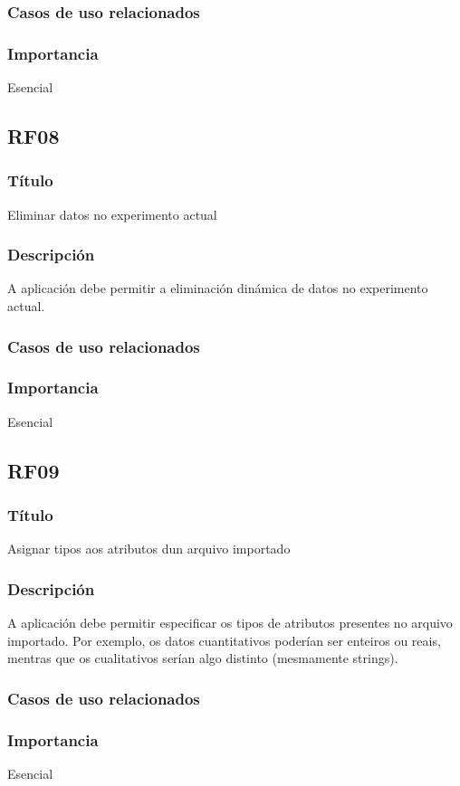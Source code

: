 \subsubsection{Casos de uso relacionados}
\subsubsection{Importancia}
Esencial

\subsection{RF08}
\subsubsection{Título}
Eliminar datos no experimento actual
\subsubsection{Descripción}
A aplicación debe permitir a eliminación dinámica de datos no experimento actual.
\subsubsection{Casos de uso relacionados}
\subsubsection{Importancia}
Esencial

\subsection{RF09}
\subsubsection{Título}
Asignar tipos aos atributos dun arquivo importado
\subsubsection{Descripción}
A aplicación debe permitir especificar os tipos de atributos presentes no arquivo importado. Por exemplo, os datos cuantitativos poderían ser enteiros ou reais, mentras que os cualitativos serían algo distinto (mesmamente strings).
\subsubsection{Casos de uso relacionados}
\subsubsection{Importancia}
Esencial

